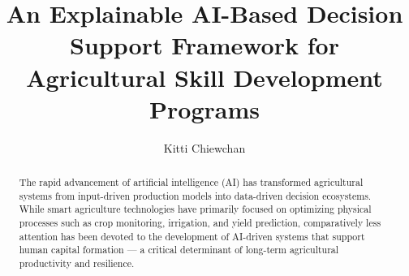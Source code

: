 \documentclass[preprint,12pt]{elsarticle}
\begin{document}
\begin{frontmatter}



\title{An Explainable AI-Based Decision Support Framework for Agricultural Skill Development Programs}


\author{Kitti Chiewchan} %


\begin{abstract}
The rapid advancement of artificial intelligence (AI) has transformed agricultural systems from input-driven production models into data-driven decision ecosystems. While smart agriculture technologies have primarily focused on optimizing physical processes such as crop monitoring, irrigation, and yield prediction, comparatively less attention has been devoted to the development of AI-driven systems that support human capital formation — a critical determinant of long-term agricultural productivity and resilience.


\end{abstract}
\end{frontmatter}
\end{document}
